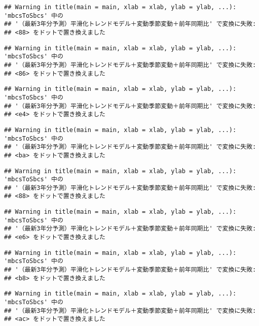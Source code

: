 \documentclass[]{article}
\begin{document}
\begin{verbatim}
## Warning in title(main = main, xlab = xlab, ylab = ylab, ...): 'mbcsToSbcs' 中の
## '（最新3年分予測）平滑化トレンドモデル＋変動季節変動＋前年同期比' で変換に失敗:
## <88> をドットで置き換えました
\end{verbatim}

\begin{verbatim}
## Warning in title(main = main, xlab = xlab, ylab = ylab, ...): 'mbcsToSbcs' 中の
## '（最新3年分予測）平滑化トレンドモデル＋変動季節変動＋前年同期比' で変換に失敗:
## <86> をドットで置き換えました
\end{verbatim}

\begin{verbatim}
## Warning in title(main = main, xlab = xlab, ylab = ylab, ...): 'mbcsToSbcs' 中の
## '（最新3年分予測）平滑化トレンドモデル＋変動季節変動＋前年同期比' で変換に失敗:
## <e4> をドットで置き換えました
\end{verbatim}

\begin{verbatim}
## Warning in title(main = main, xlab = xlab, ylab = ylab, ...): 'mbcsToSbcs' 中の
## '（最新3年分予測）平滑化トレンドモデル＋変動季節変動＋前年同期比' で変換に失敗:
## <ba> をドットで置き換えました
\end{verbatim}

\begin{verbatim}
## Warning in title(main = main, xlab = xlab, ylab = ylab, ...): 'mbcsToSbcs' 中の
## '（最新3年分予測）平滑化トレンドモデル＋変動季節変動＋前年同期比' で変換に失敗:
## <88> をドットで置き換えました
\end{verbatim}

\begin{verbatim}
## Warning in title(main = main, xlab = xlab, ylab = ylab, ...): 'mbcsToSbcs' 中の
## '（最新3年分予測）平滑化トレンドモデル＋変動季節変動＋前年同期比' で変換に失敗:
## <e6> をドットで置き換えました
\end{verbatim}

\begin{verbatim}
## Warning in title(main = main, xlab = xlab, ylab = ylab, ...): 'mbcsToSbcs' 中の
## '（最新3年分予測）平滑化トレンドモデル＋変動季節変動＋前年同期比' で変換に失敗:
## <b8> をドットで置き換えました
\end{verbatim}

\begin{verbatim}
## Warning in title(main = main, xlab = xlab, ylab = ylab, ...): 'mbcsToSbcs' 中の
## '（最新3年分予測）平滑化トレンドモデル＋変動季節変動＋前年同期比' で変換に失敗:
## <ac> をドットで置き換えました
\end{verbatim}
\end{document}
